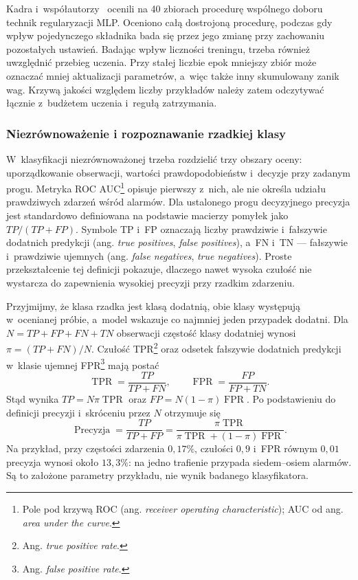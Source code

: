 Kadra i~współautorzy~\cite{kadra2021regularization} ocenili na 40 zbiorach procedurę wspólnego doboru technik regularyzacji MLP. Oceniono całą dostrojoną procedurę, podczas gdy wpływ pojedynczego składnika bada się przez jego zmianę przy zachowaniu pozostałych ustawień. Badając wpływ liczności treningu, trzeba również uwzględnić przebieg uczenia. Przy stałej liczbie epok mniejszy zbiór może oznaczać mniej aktualizacji parametrów, a~więc także inny skumulowany zanik wag. Krzywą jakości względem liczby przykładów należy zatem odczytywać łącznie z~budżetem uczenia i~regułą zatrzymania.

\subsubsection{Niezrównoważenie i rozpoznawanie rzadkiej klasy}

W~klasyfikacji niezrównoważonej trzeba rozdzielić trzy obszary oceny: uporządkowanie obserwacji, wartości prawdopodobieństw i~decyzje przy zadanym progu. Metryka ROC AUC\footnote{Pole pod krzywą ROC (ang. \textit{receiver operating characteristic}); AUC od ang. \textit{area under the curve}.} opisuje pierwszy z~nich, ale nie określa udziału prawdziwych zdarzeń wśród alarmów. Dla ustalonego progu decyzyjnego precyzja jest standardowo definiowana na podstawie macierzy pomyłek jako $TP/(TP+FP)$. Symbole TP i~FP oznaczają liczby prawdziwie i~fałszywie dodatnich predykcji (ang. \textit{true positives}, \textit{false positives}), a~FN i~TN --- fałszywie i~prawdziwie ujemnych (ang. \textit{false negatives}, \textit{true negatives}). Proste przekształcenie tej definicji pokazuje, dlaczego nawet wysoka czułość nie wystarcza do zapewnienia wysokiej precyzji przy rzadkim zdarzeniu.

Przyjmijmy, że klasa rzadka jest klasą dodatnią, obie klasy występują w~ocenianej próbie, a~model wskazuje co najmniej jeden przypadek dodatni. Dla $N=TP+FP+FN+TN$ obserwacji częstość klasy dodatniej wynosi $\pi=(TP+FN)/N$. Czułość TPR\footnote{Ang. \textit{true positive rate}.} oraz odsetek fałszywie dodatnich predykcji w~klasie ujemnej FPR\footnote{Ang. \textit{false positive rate}.} mają postać
\[
\operatorname{TPR}=\frac{TP}{TP+FN},
\qquad
\operatorname{FPR}=\frac{FP}{FP+TN}.
\]
Stąd wynika $TP=N\pi\operatorname{TPR}$ oraz $FP=N(1-\pi)\operatorname{FPR}$. Po podstawieniu do definicji precyzji i~skróceniu przez $N$ otrzymuje się
\begin{equation}
\operatorname{Precyzja}
=\frac{TP}{TP+FP}
=\frac{\pi\operatorname{TPR}}
{\pi\operatorname{TPR}+(1-\pi)\operatorname{FPR}}.
\label{eq:precyzja-czestosc}
\end{equation}
Na przykład, przy częstości zdarzenia $0{,}17\%$, czułości $0{,}9$ i~FPR równym $0{,}01$ precyzja wynosi około $13{,}3\%$: na jedno trafienie przypada siedem--osiem alarmów. Są to założone parametry przykładu, nie wynik badanego klasyfikatora.

